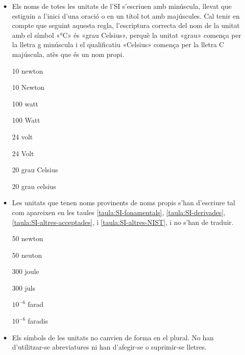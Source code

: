 \begin{itemize}
\textcolor{Green}\faCheckSquare{} \ang{45}

\textcolor{Red}\faTimesCircle{} \ang[number-angle-product = \,]{45}

\textcolor{Green}\faCheckSquare{} \ang{15;32;8}

\textcolor{Red}\faTimesCircle{} \ang[number-angle-product = \,]{15;32;8}


\item Els noms de totes les unitats de l'SI s'escriuen amb minúscula, llevat que estiguin a l'inici d'una oració o en un títol tot amb majúscules. Cal tenir en compte que seguint aquesta regla, l'escriptura  correcta
del nom de la unitat amb el símbol «\unit{\degreeCelsius}» és «grau Celsius», perquè la unitat  «grau» comença per la lletra g  minúscula i el qualificatiu «Celsius» comença per la lletra C  majúscula, atès que és un nom propi.

\textcolor{Green}\faCheckSquare{} 10 newton

\textcolor{Red}\faTimesCircle{} 10 Newton

\textcolor{Green}\faCheckSquare{}  100 watt

\textcolor{Red}\faTimesCircle{} 100 Watt

\textcolor{Green}\faCheckSquare{}  24 volt

\textcolor{Red}\faTimesCircle{} 24 Volt

\textcolor{Green}\faCheckSquare{}  20 grau Celsius

\textcolor{Red}\faTimesCircle{} 20 grau celsius


\item Les unitats que tenen noms provinents de noms propis s'han
d'escriure tal com apareixen en les taules
\vref{taula:SI-fonamentals}, \vref{taula:SI-derivades}, \vref{taula:SI-altres-acceptades}, i \vref{taula:SI-altres-NIST}, i no s'han de traduir.

\textcolor{Green}\faCheckSquare{} 50 newton

\textcolor{Red}\faTimesCircle{}  50 neuton

\textcolor{Green}\faCheckSquare{} 300 joule

\textcolor{Red}\faTimesCircle{}  300 juls

\textcolor{Green}\faCheckSquare{} $10^{-6}$ farad

\textcolor{Red}\faTimesCircle{}  $10^{-6}$ faradis


\item Els símbols de les unitats no canvien de forma en el plural. No han
d'utilitzar-se abreviatures ni han d'afegir-se o suprimir-se
lletres.


\end{itemize}
